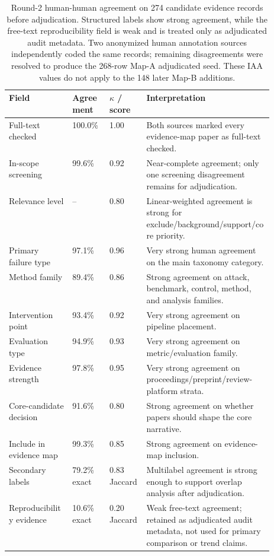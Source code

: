 \documentclass[11pt]{article}
\begin{document}

\clearpage
\begin{table}[t]
\centering
\scriptsize
\begin{tabularx}{\linewidth}{p{0.24\linewidth}p{0.14\linewidth}p{0.14\linewidth}X}
\toprule
\textbf{Field} & \textbf{Agreement} & \textbf{$\kappa$ / score} & \textbf{Interpretation} \\
\midrule
Full-text checked & 100.0\% & 1.00 & Both sources marked every evidence-map paper as full-text checked. \\
In-scope screening & 99.6\% & 0.92 & Near-complete agreement; only one screening disagreement remains for adjudication. \\
Relevance level & -- & 0.80 & Linear-weighted agreement is strong for exclude/background/support/core priority. \\
Primary failure type & 97.1\% & 0.96 & Very strong human agreement on the main taxonomy category. \\
Method family & 89.4\% & 0.86 & Strong agreement on attack, benchmark, control, method, and analysis families. \\
Intervention point & 93.4\% & 0.92 & Very strong agreement on pipeline placement. \\
Evaluation type & 94.9\% & 0.93 & Very strong agreement on metric/evaluation family. \\
Evidence strength & 97.8\% & 0.95 & Very strong agreement on proceedings/preprint/review-platform strata. \\
Core-candidate decision & 91.6\% & 0.80 & Strong agreement on whether papers should shape the core narrative. \\
Include in evidence map & 99.3\% & 0.85 & Strong agreement on evidence-map inclusion. \\
Secondary labels & 79.2\% exact & 0.83 Jaccard & Multilabel agreement is strong enough to support overlap analysis after adjudication. \\
Reproducibility evidence & 10.6\% exact & 0.20 Jaccard & Weak free-text agreement; retained as adjudicated audit metadata, not used for primary comparison or trend claims. \\
\bottomrule
\end{tabularx}
\caption{Round-2 human-human agreement on 274 candidate evidence records before adjudication. Structured labels show strong agreement, while the free-text reproducibility field is weak and is treated only as adjudicated audit metadata. Two anonymized human annotation sources independently coded the same records; remaining disagreements were resolved to produce the 268-row Map-A adjudicated seed. These IAA values do not apply to the 148 later Map-B additions.}
\label{tab:iaa}
\end{table}
\end{document}

